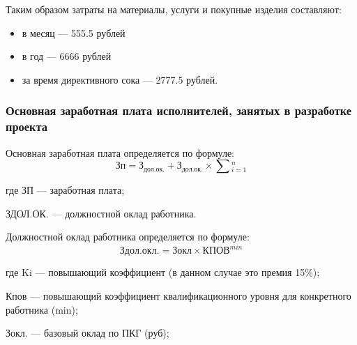 \begin{par}
Таким образом затраты на материалы, услуги и покупные изделия составляют:
\begin{itemize}
    \item{} в месяц --- 555.5 рублей
    \item{} в год --- 6666 рублей
    \item{} за время директивного сока --- 2777.5 рублей.
\end{itemize}
\end{par}

\subsubsection{Основная заработная плата исполнителей, занятых в разработке проекта}
Основная заработная плата определяется по формуле:
\begin{equation}
	Зп = З_{дол.ок.} + З_{дол.ок.} \times{} \sum{}_{i=1}^n
\end{equation}

\begin{ESKDexplanation}
	\item[где ]{} ЗП --- заработная плата;
	\item{} ЗДОЛ.ОК. --- должностной оклад работника.
\end{ESKDexplanation}

Должностной оклад работника определяется по формуле:
\begin{equation}
	Здол.окл. = Зокл \times{} КПОВ^{min}
\end{equation}

\begin{ESKDexplanation}
	\item[где ]{} Ki --- повышающий коэффициент (в данном случае это премия 15\%);
	\item{} Кпов --- повышающий коэффициент квалификационного уровня для конкретного работника (min);
	\item{} Зокл. --- базовый оклад по ПКГ (руб);
\end{ESKDexplanation}

